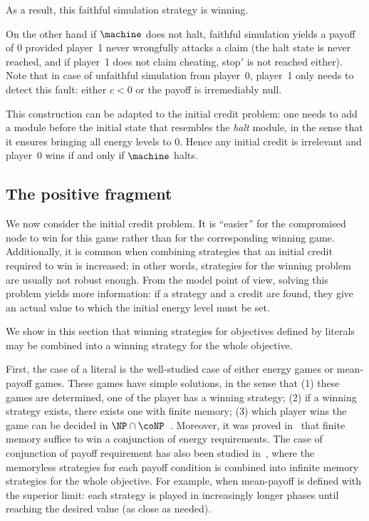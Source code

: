 As a result, this faithful simulation strategy is winning.

\bigskip

On the other hand if $\machine$ does not halt, faithful simulation yields a payoff of $0$ provided player~1 never wrongfully attacks a claim (the halt state is never reached, and if player~1 does not claim cheating, stop$'$ is not reached either).
Note that in case of unfaithful simulation from player~0, player~1 only needs to detect this fault: either $c<0$ or the payoff is irremediably null.

\bigskip

This construction can be adapted to the initial credit problem: one needs to add a module before the initial state that resembles the \emph{halt} module, in the sense that it ensures bringing all energy levels to $0$.
Hence any initial credit is irrelevant and player~0 wins if and only if $\machine$ halts.

\subsection{The positive fragment}

We now consider the initial credit problem.
It is ``easier'' for the compromised node to win for this game rather than for the corresponding winning game.
Additionally, it is common when combining strategies that an initial credit required to win is increased; in other words, strategies for the winning problem are usually not robust enough.
From the model point of view, solving this problem yields more information: if a strategy and a credit are found, they give an actual value to which the initial energy level must be set.

\bigskip

We show in this section that winning strategies for objectives defined by literals may be combined into a winning strategy for the whole objective.

First, the case of a literal is the well-studied case of either energy games or mean-payoff games.
These games have simple solutions, in the sense that (1) these games are determined, \ie one of the player has a winning strategy; (2) if a winning strategy exists, there exists one with finite memory; (3) which player wins the game can be decided in $\NP\cap \coNP$~\cite{zwick96}.
Moreover, it was proved in~\cite{velner12a} that finite memory suffice to win a conjunction of energy requirements.
The case of conjunction of payoff requirement has also been studied in~\cite{velner12a}, where the memoryless strategies for each payoff condition is combined into infinite memory strategies for the whole objective.
For example, when mean-payoff is defined with the superior limit: each strategy is played in increasingly longer phases until reaching the desired value (as close as needed).

